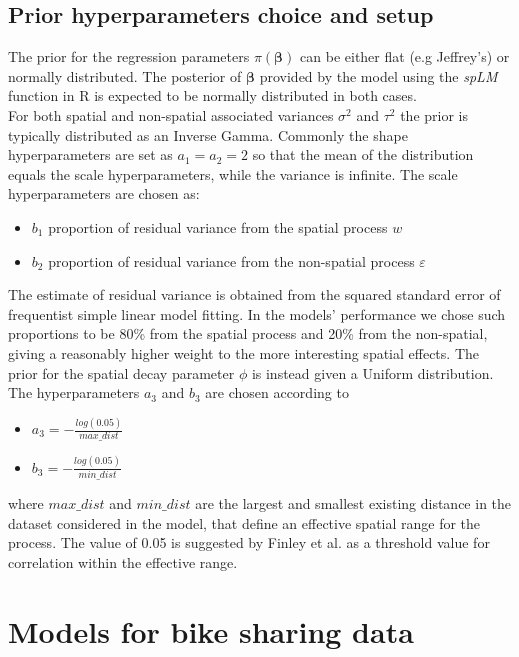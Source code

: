 \documentclass[12pt]{article}
\begin{document}
	\subsection{Prior hyperparameters choice and setup}
	The prior for the regression parameters $\pi(\boldsymbol{\beta})$ can be either flat (e.g Jeffrey's) or normally distributed. The posterior of $\boldsymbol{\beta}$ provided by the model using the \emph{spLM} function in R is expected to be normally distributed in both cases.\\

\noindent
	For both spatial and non-spatial associated variances $\sigma^2$ and $\tau^2$ the prior is typically distributed as an Inverse Gamma. Commonly the shape hyperparameters are set as $a_1 = a_2 = 2$ so that the mean of the distribution equals the scale hyperparameters, while the variance is infinite. The scale hyperparameters are chosen as: 
	\begin{itemize}
		\item $b_1$ proportion of residual variance from the spatial process $w$
		\item $b_2$ proportion of residual variance from the non-spatial process $\varepsilon$
	\end{itemize}
	The estimate of residual variance is obtained from the squared standard error of frequentist simple linear model fitting. In the models' performance we chose such proportions to be 80\% from the spatial process and 20\% from the non-spatial, giving a reasonably higher weight to the more interesting spatial effects.
The prior for the spatial decay parameter $\phi$ is instead given a Uniform distribution. 
The hyperparameters $a_3$ and $b_3$ are chosen according to
	\begin{itemize}
		\item $a_3 = -\displaystyle\frac{log(0.05)}{max\_dist}$ 
		\item $b_3 = -\displaystyle\frac{log(0.05)}{min\_dist}$
	\end{itemize}
	where $max\_dist$ and $min\_dist$ are the largest and smallest existing distance in the dataset considered in the model, that define an effective spatial range for the process. The value of 0.05 is suggested by Finley et al. \cite{spbayes} as a threshold value for correlation within the effective range.

	\section{Models for bike sharing data}
\end{document}
